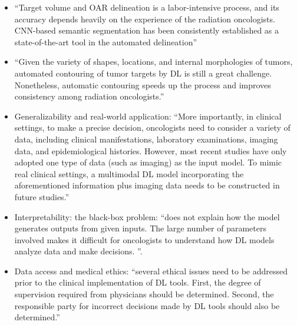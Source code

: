 \documentclass[11pt]{article}
\begin{document}
\begin{itemize}
    \item ``Target volume and OAR delineation is a labor-intensive process, and its accuracy depends heavily on the experience of the radiation oncologists. CNN-based semantic segmentation has been consistently established as a state-of-the-art tool in the automated delineation''
    \item ``Given the variety of shapes, locations, and internal morphologies of tumors, automated contouring of tumor targets by DL is still a great challenge. Nonetheless, automatic contouring speeds up the process and improves consistency among radiation oncologists.''
    \item Generalizability and real-world application: ``More importantly, in clinical settings, to make a precise decision, oncologists need to consider a variety of data, including clinical manifestations, laboratory examinations, imaging data, and epidemiological histories. However, most recent studies have only adopted one type of data (such as imaging) as the input model. To mimic real clinical settings, a multimodal DL model incorporating the aforementioned information plus imaging data needs to be constructed in future studies.''
    \item Interpretability: the black-box problem: ``does not explain how the model generates outputs from given inputs. The large number of parameters involved makes it difficult for oncologists to understand how DL models analyze data and make decisions. ''.
    \item Data access and medical ethics: ``several ethical issues need to be addressed prior to the clinical implementation of DL tools. First, the degree of supervision required from physicians should be determined. Second, the responsible party for incorrect decisions made by DL tools should also be determined.''
\end{itemize}

\printbibliography
\end{document}
